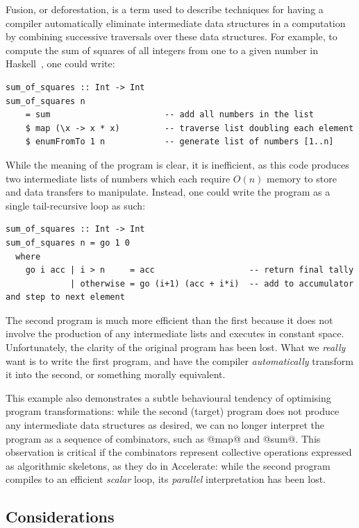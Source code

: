 Fusion, or deforestation, is a term used to describe techniques for having a
compiler automatically eliminate intermediate data structures in a computation
by combining successive traversals over these data structures. For example, to
compute the sum of squares of all integers from one to a given number in
Haskell~\cite{Haskell:1998}, one could write:
%
\begin{lstlisting}[style=haskell]
sum_of_squares :: Int -> Int
sum_of_squares n
    = sum                       -- add all numbers in the list
    $ map (\x -> x * x)         -- traverse list doubling each element
    $ enumFromTo 1 n            -- generate list of numbers [1..n]
\end{lstlisting}
%
While the meaning of the program is clear, it is inefficient, as this code
produces two intermediate lists of numbers which each require $O(n)$ memory to
store and data transfers to manipulate. Instead, one could write the program
as a single tail-recursive loop as such:
%
\begin{lstlisting}[style=haskell]
sum_of_squares :: Int -> Int
sum_of_squares n = go 1 0
  where
    go i acc | i > n     = acc                   -- return final tally
             | otherwise = go (i+1) (acc + i*i)  -- add to accumulator and step to next element
\end{lstlisting}
%
The second program is much more efficient than the first because it does not
involve the production of any intermediate lists and executes in constant space.
Unfortunately, the clarity of the original program has been lost. What we
\emph{really} want is to write the first program, and have the compiler
\emph{automatically} transform it into the second, or something morally
equivalent.

This example also demonstrates a subtle behavioural tendency of optimising
program transformations: while the second (target) program does not produce any
intermediate data structures as desired, we can no longer interpret the program
as a sequence of combinators, such as @map@ and @sum@. This observation is
critical if the combinators represent collective operations expressed as
algorithmic skeletons, as they do in Accelerate: while the second program
compiles to an efficient \emph{scalar} loop, its \emph{parallel} interpretation
has been lost.


\subsection{Considerations}

